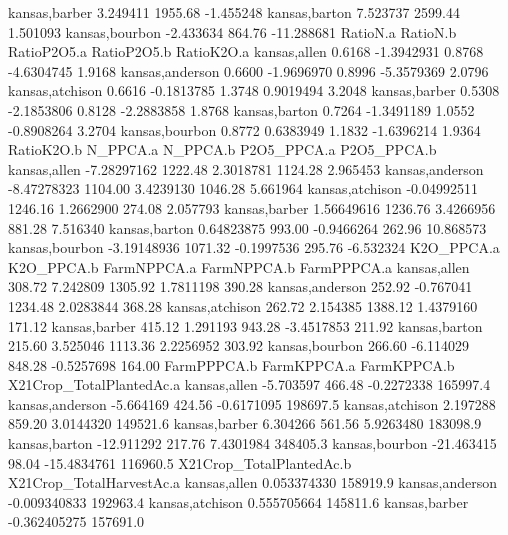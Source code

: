 \documentclass{report}
\begin{document}
\begin{Schunk}
\begin{Soutput}
kansas,barber             3.249411           1955.68         -1.455248
kansas,barton             7.523737           2599.44          1.501093
kansas,bourbon           -2.433634            864.76        -11.288681
                RatioN.a   RatioN.b RatioP2O5.a RatioP2O5.b RatioK2O.a
kansas,allen      0.6168 -1.3942931      0.8768  -4.6304745     1.9168
kansas,anderson   0.6600 -1.9696970      0.8996  -5.3579369     2.0796
kansas,atchison   0.6616 -0.1813785      1.3748   0.9019494     3.2048
kansas,barber     0.5308 -2.1853806      0.8128  -2.2883858     1.8768
kansas,barton     0.7264 -1.3491189      1.0552  -0.8908264     3.2704
kansas,bourbon    0.8772  0.6383949      1.1832  -1.6396214     1.9364
                 RatioK2O.b N_PPCA.a   N_PPCA.b P2O5_PPCA.a P2O5_PPCA.b
kansas,allen    -7.28297162  1222.48  2.3018781     1124.28    2.965453
kansas,anderson -8.47278323  1104.00  3.4239130     1046.28    5.661964
kansas,atchison -0.04992511  1246.16  1.2662900      274.08    2.057793
kansas,barber    1.56649616  1236.76  3.4266956      881.28    7.516340
kansas,barton    0.64823875   993.00 -0.9466264      262.96   10.868573
kansas,bourbon  -3.19148936  1071.32 -0.1997536      295.76   -6.532324
                K2O_PPCA.a K2O_PPCA.b FarmNPPCA.a FarmNPPCA.b FarmPPPCA.a
kansas,allen        308.72   7.242809     1305.92   1.7811198      390.28
kansas,anderson     252.92  -0.767041     1234.48   2.0283844      368.28
kansas,atchison     262.72   2.154385     1388.12   1.4379160      171.12
kansas,barber       415.12   1.291193      943.28  -3.4517853      211.92
kansas,barton       215.60   3.525046     1113.36   2.2256952      303.92
kansas,bourbon      266.60  -6.114029      848.28  -0.5257698      164.00
                FarmPPPCA.b FarmKPPCA.a FarmKPPCA.b X21Crop_TotalPlantedAc.a
kansas,allen      -5.703597      466.48  -0.2272338                 165997.4
kansas,anderson   -5.664169      424.56  -0.6171095                 198697.5
kansas,atchison    2.197288      859.20   3.0144320                 149521.6
kansas,barber      6.304266      561.56   5.9263480                 183098.9
kansas,barton    -12.911292      217.76   7.4301984                 348405.3
kansas,bourbon   -21.463415       98.04 -15.4834761                 116960.5
                X21Crop_TotalPlantedAc.b X21Crop_TotalHarvestAc.a
kansas,allen                 0.053374330                 158919.9
kansas,anderson             -0.009340833                 192963.4
kansas,atchison              0.555705664                 145811.6
kansas,barber               -0.362405275                 157691.0

\end{Soutput}
\end{Schunk}
\end{document}

